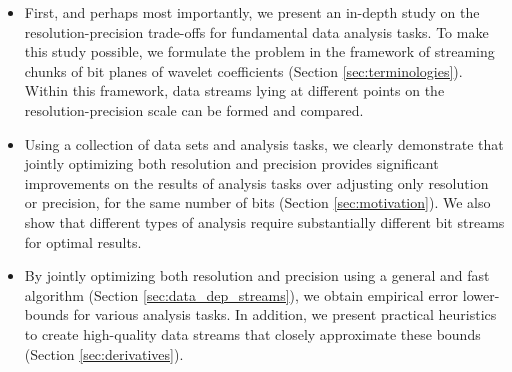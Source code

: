 \begin{itemize}
\item First, and perhaps most importantly, we present an in-depth study on the
  resolution-precision trade-offs for fundamental data analysis tasks. To make this study possible,
  we formulate the problem in the framework of streaming chunks of bit planes of wavelet
  coefficients (Section \ref{sec:terminologies}). Within this framework, data streams lying at
  different points on the resolution-precision scale can be formed and compared. 
   
\item Using a collection of data sets and analysis tasks, we clearly demonstrate that jointly optimizing
  both resolution and precision provides significant improvements on the results of analysis tasks
  over adjusting only resolution or precision, for the same number of bits (Section
  \ref{sec:motivation}). We also show that different types of analysis require substantially
  different bit streams for optimal results.

\item By jointly optimizing both resolution and precision using a general and fast algorithm
  (Section \ref{sec:data_dep_streams}), we obtain empirical error lower-bounds for various analysis
  tasks. In addition, we present practical heuristics to create high-quality data streams that
  closely approximate these bounds (Section \ref{sec:derivatives}).
\end{itemize}


